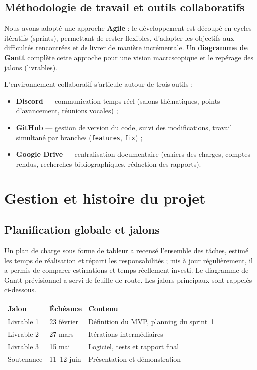 \documentclass[11pt,a4paper]{article}
\newcommand{\code}[1]{\texttt{#1}}
\begin{document}
\subsection{Méthodologie de travail et outils collaboratifs}
Nous avons adopté une approche \textbf{Agile} : le développement est découpé en
cycles itératifs (sprints), permettant de rester flexibles, d'adapter les
objectifs aux difficultés rencontrées et de livrer de manière incrémentale. Un
\textbf{diagramme de Gantt} complète cette approche pour une vision macroscopique
et le repérage des jalons (livrables).

\medskip
L'environnement collaboratif s'articule autour de trois outils :
\begin{itemize}[leftmargin=1.4em]
  \item \textbf{Discord} --- communication temps réel (salons thématiques, points
        d'avancement, réunions vocales) ;
  \item \textbf{GitHub} --- gestion de version du code, suivi des modifications,
        travail simultané par branches (\code{features}, \code{fix}) ;
  \item \textbf{Google Drive} --- centralisation documentaire (cahiers des charges,
        comptes rendus, recherches bibliographiques, rédaction des rapports).
\end{itemize}

\section{Gestion et histoire du projet}
\subsection{Planification globale et jalons}
Un plan de charge sous forme de tableur a recensé l'ensemble des tâches, estimé
les temps de réalisation et réparti les responsabilités ; mis à jour
régulièrement, il a permis de comparer estimations et temps réellement investi.
Le diagramme de Gantt prévisionnel a servi de feuille de route. Les jalons
principaux sont rappelés ci-dessous.

\begin{center}
\begin{tabular}{@{}lll@{}}
\toprule
\textbf{Jalon} & \textbf{Échéance} & \textbf{Contenu} \\
\midrule
Livrable 1 & 23 février & Définition du MVP, planning du sprint~1 \\
Livrable 2 & 27 mars    & Itérations intermédiaires \\
Livrable 3 & 15 mai     & Logiciel, tests et rapport final \\
Soutenance & 11--12 juin & Présentation et démonstration \\
\bottomrule
\end{tabular}
\end{center}
\end{document}
